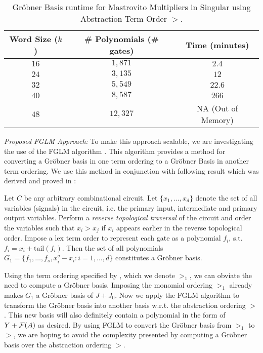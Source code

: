\begin{table}[h]
{\small
	\begin{center}
	    \caption{Gr\"obner Basis runtime for
              Mastrovito Multipliers in Singular using Abstraction
              Term Order $>$.}\label{tab:sT} 
	    \begin{tabular}{|c|c||c|} 
	        \hline
		Word Size ($k$) & \# Polynomials (\# gates) & Time (minutes)   \\
		\hline
	        $16$	&  $1,871$  & $2.4$ \\
		$24$	&  $3,135$  & $12$  \\
	        $32$	&  $5,549$  & $22.6$ \\
	        $40$	&  $8,587$  & $266$ \\
		$48$	& $12,327$  & NA (Out of Memory) \\
	        \hline
	    \end{tabular}
	\end{center} 
}
\end{table}

{\it Proposed FGLM Approach:} To make this approach scalable, we are
investigating the use of the FGLM algorithm \cite{fglm}. This
algorithm provides a method for converting a Gr\"obner basis in one
term ordering to a  Gr\"obner Basis in another term ordering.
We use this method in conjunction with following result which was
derived and proved in \cite{lv:date2012}: 

\begin{Theorem} \label{thm:top-order}
Let $C$ be any arbitrary combinational circuit. Let $\{x_1, \dots,
x_d\}$ denote the set of all variables (signals) in the circuit,
i.e. the primary input, intermediate and primary output
variables. Perform a {\it reverse topological traversal} of the
circuit and order the variables such that $x_i > x_j$ if $x_i$ appears
earlier in the reverse topological order. Impose a lex term order to
represent each gate as a polynomial $f_i$,
s.t. $f_i = x_i + \text{tail}(f_i)$. Then the set of all polynomials 
$G_1 = \{f_1, \dots, f_s, x_i^q - x_i: i = 1, \dots, d\}$ constitutes
a Gr\"obner basis.
\end{Theorem}



Using the term ordering specified by \cite{lv:date2012}, which we
denote $>_1$,  we can obviate the need to compute a Gr\"obner
basis. Imposing the monomial ordering $>_1$ already makes $G_1$ a
Gr\"obner basis of $J + J_0$. Now we apply the FGLM algorithm to
transform the Gr\"obner basis into another basis w.r.t. the
abstraction ordering $>$.  This new basis will also definitely contain
a polynomial in the form of $Y + {\mathcal{F}}(A)$ as desired. By using FGLM to
convert the Gr\"obner basis from $>_1$ to $>$, we are hoping to avoid
the complexity presented by computing a Gr\"obner basis over the
abstraction ordering $>$.  


